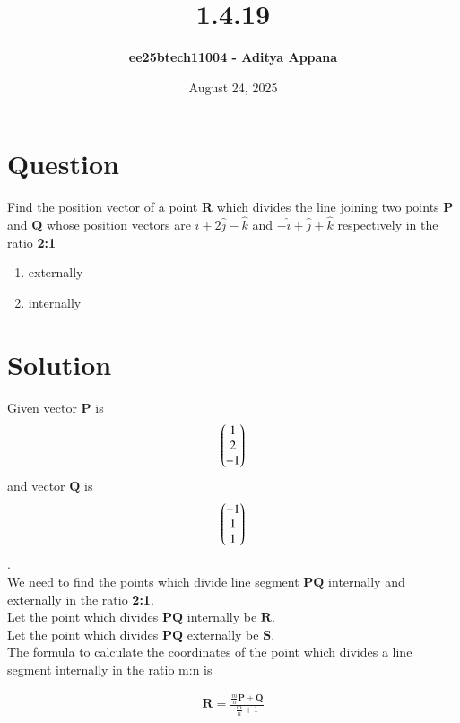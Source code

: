 \documentclass[12pt]{article}
\title{\textbf{1.4.19}}
\author{\textbf{ee25btech11004 - Aditya Appana}}
\date{August 24, 2025}
\begin{document}
\maketitle

\section{Question}


Find the position vector of a point \textbf{R} which divides the line joining two points \textbf{P} and \textbf{Q} whose position vectors are $ \hat{i} + 2\hat{j} - \hat{k}$ and $-\hat{i} + \hat{j} + \hat{k} $ respectively in the ratio \textbf{2:1}
\begin{enumerate}[label=(\alph*)]
    \item externally
    \item internally   
\end{enumerate}

\section{Solution}

Given vector $\mathbf{P}$ is \begin{align} \myvec{ 1 \\ 2\\ -1}\end{align} and vector $\mathbf{Q}$ is \begin{align}\myvec{ -1 \\ 1 \\ 1 }\end{align} . \\

We need to find the points which divide line segment $\mathbf{PQ}$ internally and externally in the ratio \textbf{2:1}. \\



Let the point which divides $\mathbf{PQ}$ internally be $\mathbf{R}$. \\

Let the point which divides $\mathbf{PQ}$ externally be $\mathbf{S}$. \\

The formula to calculate the coordinates of the point which divides a line segment internally in the ratio m:n is 



\begin{align}
    \mathbf{R}=\frac{\frac{m}{n}\mathbf{P}+\mathbf{Q}}{\frac{m}{n}+1}
\end{align}
\end{document}
